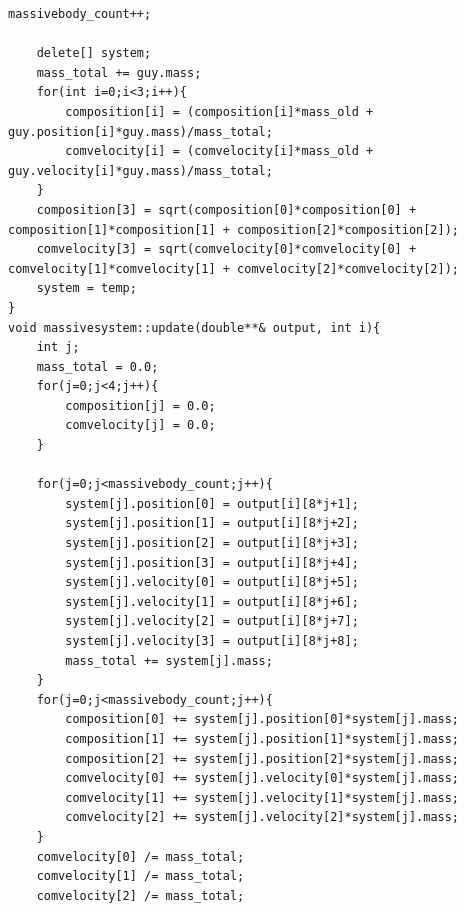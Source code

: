 \documentclass[11pt,a4paper]{article}
\begin{document}
\begin{lstlisting}[title={project3-library.h}]
	massivebody_count++;

	delete[] system;
	mass_total += guy.mass;
	for(int i=0;i<3;i++){
		composition[i] = (composition[i]*mass_old + guy.position[i]*guy.mass)/mass_total;
		comvelocity[i] = (comvelocity[i]*mass_old + guy.velocity[i]*guy.mass)/mass_total;
	}
	composition[3] = sqrt(composition[0]*composition[0] + composition[1]*composition[1] + composition[2]*composition[2]);
	comvelocity[3] = sqrt(comvelocity[0]*comvelocity[0] + comvelocity[1]*comvelocity[1] + comvelocity[2]*comvelocity[2]);
	system = temp;
}
void massivesystem::update(double**& output, int i){
	int j;
	mass_total = 0.0;
	for(j=0;j<4;j++){
		composition[j] = 0.0;
		comvelocity[j] = 0.0;
	}

	for(j=0;j<massivebody_count;j++){
		system[j].position[0] = output[i][8*j+1];
		system[j].position[1] = output[i][8*j+2];
		system[j].position[2] = output[i][8*j+3];
		system[j].position[3] = output[i][8*j+4];
		system[j].velocity[0] = output[i][8*j+5];
		system[j].velocity[1] = output[i][8*j+6];
		system[j].velocity[2] = output[i][8*j+7];
		system[j].velocity[3] = output[i][8*j+8];
		mass_total += system[j].mass;
	}
	for(j=0;j<massivebody_count;j++){
		composition[0] += system[j].position[0]*system[j].mass;
		composition[1] += system[j].position[1]*system[j].mass;
		composition[2] += system[j].position[2]*system[j].mass;
		comvelocity[0] += system[j].velocity[0]*system[j].mass;
		comvelocity[1] += system[j].velocity[1]*system[j].mass;
		comvelocity[2] += system[j].velocity[2]*system[j].mass;
	}
	comvelocity[0] /= mass_total;
	comvelocity[1] /= mass_total;
	comvelocity[2] /= mass_total;


\end{lstlisting}
\end{document}
